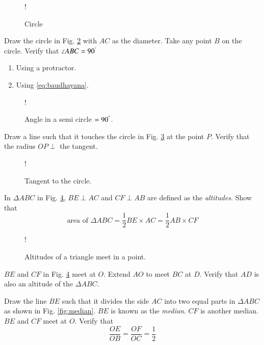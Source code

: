 \documentclass[journal,12pt,twocolumn]{IEEEtran}
\begin{document}
\begin{figure}[!h]
\centering
\resizebox {\columnwidth} {!} {

}
\caption{Circle}
\label{fig:pi}
\end{figure}
\begin{problem}
Draw the circle in Fig. \ref{fig:semi_circle}  with $AC$ as the diameter.  Take any point $B$ on the circle.  Verify that $\angle ABC = 90^{\degree}$ 
\begin{enumerate}
\item Using a protractor.
\item Using \eqref{eq:baudhayana}.
\end{enumerate}
\end{problem}

\begin{figure}[!h]
\centering
\resizebox {\columnwidth} {!} {

}
\caption{Angle in a semi circle $= 90^{\degree}$.}
\label{fig:semi_circle}
\end{figure}
%
\begin{problem}
Draw a line such that it touches the circle in Fig. \ref{fig:tangent}  at the point $P$. Verify that the radius $OP \perp$ the tangent.
\end{problem}
%
\begin{figure}[!h]
\centering
\resizebox {\columnwidth} {!} {

}
\caption{Tangent to the circle.}
\label{fig:tangent}
\end{figure}
%
%
\begin{problem}
In $ \Delta ABC$ in Fig. \ref{fig:altitude}, $BE \perp AC$ and $CF \perp AB$ are defined as the {\em altitudes}.  Show that 
\begin{equation}
\text{area of } \Delta ABC = \frac{1}{2}BE \times AC = \frac{1}{2} AB \times CF
\end{equation}
\end{problem}
%
\begin{figure}[!h]
\centering
\resizebox {\columnwidth} {!} {

}
\caption{Altitudes of a triangle meet in a point.}
\label{fig:altitude}
\end{figure}
%
\begin{problem}
$BE$ and $CF$ in Fig. \ref{fig:altitude} meet at $O$.  Extend $AO$ to meet $BC$ at $D$. Verify that $AD$ is also an altitude of the $\Delta ABC$.
\end{problem}
%
\begin{problem}
Draw the line $BE$ such that it divides the side $AC$ into two equal parts in $ \Delta ABC$ as shown in Fig. \ref{fig:median}. $BE$ is known as the {\em median}.  $CF$ is another median.
$BE$ and $CF$ meet at $O$.  Verify that
\begin{equation}
\frac{OE}{OB} = \frac{OF}{OC} = \frac{1}{2}
\end{equation}
\end{problem}
\end{document}
